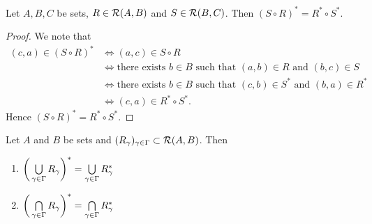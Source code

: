 \begin{ex}
	Let $A, B, C$ be sets, $R \in \mathcal{R}(A,B)$ and $S \in \mathcal{R}(B,C)$. Then $(S \circ R)^* = R^* \circ S^*$.  
\end{ex}

\begin{proof}
	We note that 
	\begin{align*}
		(c,a) \in (S \circ R)^*
		& \iff (a,c) \in S \circ R \\
		& \iff \text{there exists $b \in B$ such that $(a,b) \in R$ and $(b,c) \in S$} \\
		& \iff \text{there exists $b \in B$ such that $(c,b) \in S^*$ and $(b, a) \in R^*$} \\
		& \iff (c, a) \in R^* \circ S^*.
	\end{align*}
	Hence $(S \circ R)^* = R^* \circ S^*$.
\end{proof}

\begin{ex}
	Let $A$ and $B$ be sets and $(R_{\gamma})_{\gamma \in \Gamma} \subset \mathcal{R}(A, B)$. Then 
	\begin{enumerate}
		\item $\bigg( \bigcup\limits_{\gamma \in \Gamma} R_{\gamma} \bigg)^* = \bigcup\limits_{\gamma \in \Gamma} R_{\gamma}^*$
		\item $\bigg( \bigcap\limits_{\gamma \in \Gamma} R_{\gamma} \bigg)^* = \bigcap\limits_{\gamma \in \Gamma} R_{\gamma}^*$
	\end{enumerate}
\end{ex}

